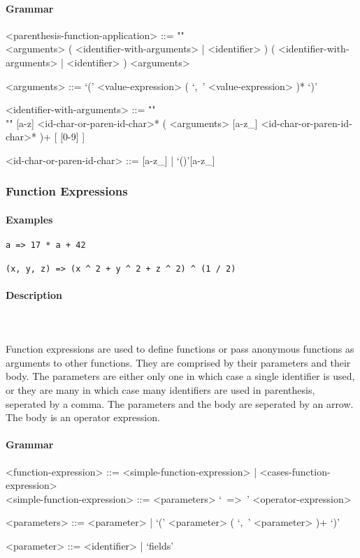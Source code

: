 \documentclass{article}
\def\pend{\mbox{} \\\\}
\begin{document}
\paragraph{Grammar}
\begin{grammar}
<parenthesis-function-application> ::= ""\\
<arguments> ( <identifier-with-arguments> | <identifier> )
\alt ( <identifier-with-arguments> | <identifier> ) <arguments>

<arguments> ::= `(' <value-expression> ( `,\ ' <value-expression> )* `)'

<identifier-with-arguments> ::= ""\\""
[a-z] <id-char-or-paren-id-char>* ( <arguments> [a-z_]
<id-char-or-paren-id-char>* )+ [ [0-9] ]

<id-char-or-paren-id-char> ::= [a-z_] | `()'[a-z_]
\end{grammar}

\subsubsection{Function Expressions}

\paragraph{Examples}

\begin{verbatim}
a => 17 * a + 42

(x, y, z) => (x ^ 2 + y ^ 2 + z ^ 2) ^ (1 / 2)
\end{verbatim}

\paragraph{Description}\pend
Function expressions are used to define functions or pass anonymous functions as 
arguments to other functions. They are comprised by their parameters and their 
body. The parameters are either only one in which case a single identifier is used, 
or they are many in which case many identifiers are used in parenthesis, seperated 
by a comma. The parameters and the body are seperated by an arrow.
The body is an operator expression.

\paragraph{Grammar}
\begin{grammar}
<function-expression> ::=
<simple-function-expression> | <cases-function-expression>\\

<simple-function-expression> ::= <parameters> `\ =>\ ' <operator-expression> 

<parameters> ::= <parameter> | `(' <parameter> ( `,\ ' <parameter> )+ `)'

<parameter> ::= <identifier> | `fields'\\

\end{grammar}
\end{document}
